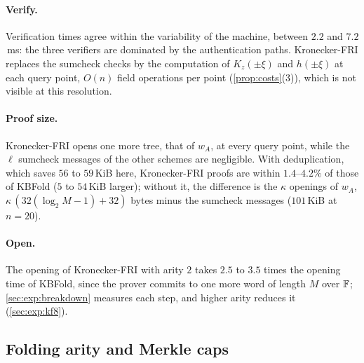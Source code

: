 \paragraph{Verify.}
Verification times agree within the variability of the machine, between $2.2$ and $7.2$\,ms: the three verifiers are dominated by the authentication paths. Kronecker-FRI replaces the sumcheck checks by the computation of $K_z(\pm\xi)$ and $h(\pm\xi)$ at each query point, $O(n)$ field operations per point (\cref{prop:costs}(3)), which is not visible at this resolution.

\paragraph{Proof size.}
Kronecker-FRI opens one more tree, that of $w_A$, at every query point, while the $\ell$ sumcheck messages of the other schemes are negligible. With deduplication, which saves $56$ to $59$\,KiB here, Kronecker-FRI proofs are within $1.4$--$4.2\%$ of those of KBFold ($5$ to $54$\,KiB larger); without it, the difference is the $\kappa$ openings of $w_A$, $\kappa\,(32(\log_2 M - 1) + 32)$ bytes minus the sumcheck messages ($101$\,KiB at $n = 20$).

\paragraph{Open.}
The opening of Kronecker-FRI with arity $2$ takes $2.5$ to $3.5$ times the opening time of KBFold, since the prover commits to one more word of length $M$ over $\mathbb{F}$; \cref{sec:exp:breakdown} measures each step, and higher arity reduces it (\cref{sec:exp:kf8}).

\subsection{Folding arity and Merkle caps}\label{sec:exp:arity}

